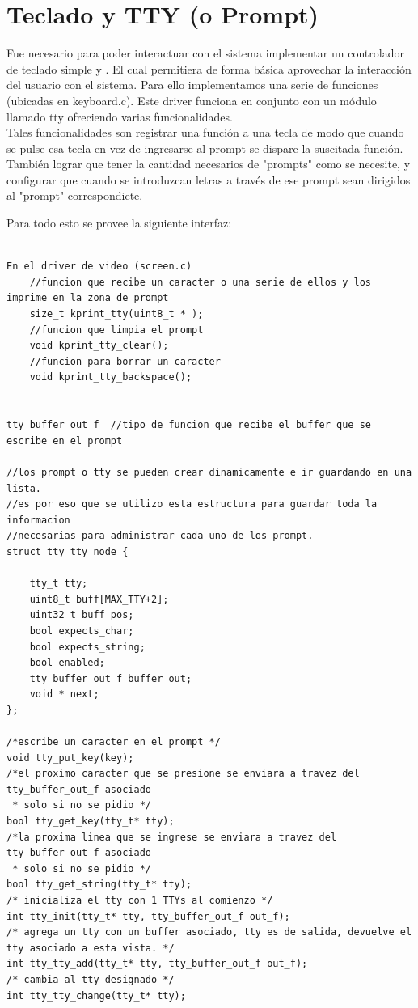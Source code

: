 \documentclass[a4paper,10pt]{article}
\begin{document}
\section{Teclado y TTY (o Prompt)}
Fue necesario para poder interactuar con el sistema implementar un controlador de teclado simple y . El cual permitiera de forma básica aprovechar la interacción del usuario con el sistema. Para ello implementamos una serie de funciones (ubicadas en keyboard.c). Este driver funciona en conjunto con un módulo llamado tty ofreciendo varias funcionalidades.\\
Tales funcionalidades son registrar una función a una tecla de modo que cuando se pulse esa tecla en vez de ingresarse al prompt se dispare la suscitada función. También lograr que tener la cantidad necesarios de "prompts" como se necesite, y configurar que cuando se introduzcan letras a través de ese prompt sean dirigidos al "prompt" correspondiete.

Para todo esto se provee la siguiente interfaz:

\begin{verbatim}

En el driver de video (screen.c)
    //funcion que recibe un caracter o una serie de ellos y los imprime en la zona de prompt
    size_t kprint_tty(uint8_t * );
    //funcion que limpia el prompt
    void kprint_tty_clear();
    //funcion para borrar un caracter
    void kprint_tty_backspace();


tty_buffer_out_f  //tipo de funcion que recibe el buffer que se escribe en el prompt

//los prompt o tty se pueden crear dinamicamente e ir guardando en una lista.
//es por eso que se utilizo esta estructura para guardar toda la informacion 
//necesarias para administrar cada uno de los prompt.
struct tty_tty_node {
    
    tty_t tty;
    uint8_t buff[MAX_TTY+2];
    uint32_t buff_pos;
    bool expects_char;
    bool expects_string;
    bool enabled;
    tty_buffer_out_f buffer_out;
    void * next;
};

/*escribe un caracter en el prompt */
void tty_put_key(key);
/*el proximo caracter que se presione se enviara a travez del tty_buffer_out_f asociado
 * solo si no se pidio */
bool tty_get_key(tty_t* tty);
/*la proxima linea que se ingrese se enviara a travez del tty_buffer_out_f asociado
 * solo si no se pidio */
bool tty_get_string(tty_t* tty);
/* inicializa el tty con 1 TTYs al comienzo */
int tty_init(tty_t* tty, tty_buffer_out_f out_f);
/* agrega un tty con un buffer asociado, tty es de salida, devuelve el tty asociado a esta vista. */
int tty_tty_add(tty_t* tty, tty_buffer_out_f out_f);
/* cambia al tty designado */
int tty_tty_change(tty_t* tty);
\end{verbatim}
\end{document}

